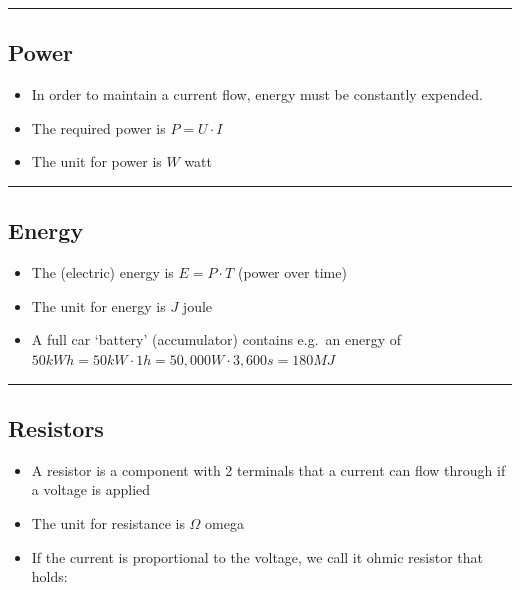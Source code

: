 \documentclass[a4paper]{article}
\providecommand{\tightlist}{%
  \setlength{\itemsep}{0pt}\setlength{\parskip}{0pt}}
\begin{document}
\begin{multicols*}{3}
\begin{center}\rule{0.5\linewidth}{0.5pt}\end{center}

\hypertarget{power}{%
\subsection{Power}\label{power}}

\begin{itemize}
\tightlist
\item
  In order to maintain a current flow, energy must be constantly
  expended.
\item
  The required power is \(P=U\cdot I\)
\item
  The unit for power is \(W\) watt
\end{itemize}

\begin{center}\rule{0.5\linewidth}{0.5pt}\end{center}

\hypertarget{energy}{%
\subsection{Energy}\label{energy}}

\begin{itemize}
\tightlist
\item
  The (electric) energy is \(E=P\cdot T\) (power over time)
\item
  The unit for energy is \(J\) joule
\item
  A full car `battery' (accumulator) contains e.g.~an energy of
  \(50 kWh = 50 kW \cdot 1h = 50,000 W \cdot 3,600 s = 180 MJ\)
\end{itemize}

\begin{center}\rule{0.5\linewidth}{0.5pt}\end{center}

\hypertarget{resistors}{%
\subsection{Resistors}\label{resistors}}

\begin{itemize}
\tightlist
\item
  A resistor is a component with 2 terminals that a current can flow
  through if a voltage is applied
\item
  The unit for resistance is \(\Omega\) omega
\item
  If the current is proportional to the voltage, we call it ohmic
  resistor that holds:


\end{itemize}
\end{multicols*}
\end{document}
